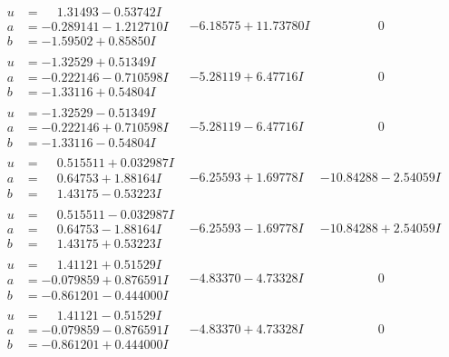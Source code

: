 \documentclass[1p]{elsarticle_modified}
\theoremstyle{definition}
\begin{document}
$$\begin{array}{c|c|c}
\begin{aligned}
u &= \phantom{-}1.31493 - 0.53742 I \\
a &= -0.289141 - 1.212710 I \\
b &= -1.59502 + 0.85850 I\end{aligned}
 & -6.18575 + 11.73780 I & \phantom{-0.000000 } 0 \\ \hline\begin{aligned}
u &= -1.32529 + 0.51349 I \\
a &= -0.222146 - 0.710598 I \\
b &= -1.33116 + 0.54804 I\end{aligned}
 & -5.28119 + 6.47716 I & \phantom{-0.000000 } 0 \\ \hline\begin{aligned}
u &= -1.32529 - 0.51349 I \\
a &= -0.222146 + 0.710598 I \\
b &= -1.33116 - 0.54804 I\end{aligned}
 & -5.28119 - 6.47716 I & \phantom{-0.000000 } 0 \\ \hline\begin{aligned}
u &= \phantom{-}0.515511 + 0.032987 I \\
a &= \phantom{-}0.64753 + 1.88164 I \\
b &= \phantom{-}1.43175 - 0.53223 I\end{aligned}
 & -6.25593 + 1.69778 I & -10.84288 - 2.54059 I \\ \hline\begin{aligned}
u &= \phantom{-}0.515511 - 0.032987 I \\
a &= \phantom{-}0.64753 - 1.88164 I \\
b &= \phantom{-}1.43175 + 0.53223 I\end{aligned}
 & -6.25593 - 1.69778 I & -10.84288 + 2.54059 I \\ \hline\begin{aligned}
u &= \phantom{-}1.41121 + 0.51529 I \\
a &= -0.079859 + 0.876591 I \\
b &= -0.861201 - 0.444000 I\end{aligned}
 & -4.83370 - 4.73328 I & \phantom{-0.000000 } 0 \\ \hline\begin{aligned}
u &= \phantom{-}1.41121 - 0.51529 I \\
a &= -0.079859 - 0.876591 I \\
b &= -0.861201 + 0.444000 I\end{aligned}
 & -4.83370 + 4.73328 I & \phantom{-0.000000 } 0 \\ \hline\begin{aligned}

\end{aligned}
\end{array}$$
\end{document}
